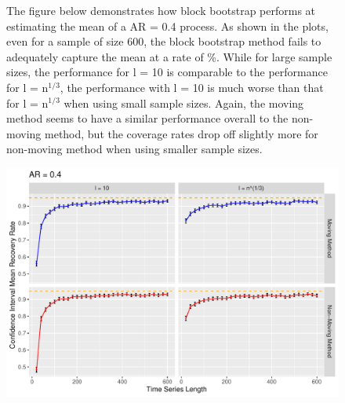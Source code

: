 \documentclass[12pt, letterpaper, titlepage]{article}
\begin{document}
\begin{figure}[tbp]
\caption{The figure below demonstrates how block bootstrap performs at estimating the mean of a AR = 0.4 process. As shown in the plots, even for a sample of size 600, the block bootstrap method fails to adequately capture the mean at a rate of \%.  While for large sample sizes, the performance for l = 10 is comparable to the performance for l = n$^{1/3}$, the performance with l = 10 is much worse than that for l = n$^{1/3}$ when using small sample sizes. Again, the moving method seems to have a similar performance overall to the non-moving method, but the coverage rates drop off slightly more for non-moving method when using smaller sample sizes.}
  \centering
  \includegraphics[width=\textwidth]{ar_0.4}
  \caption{}
  \label{fig:ar_0.4}
\end{figure}
\end{document}
